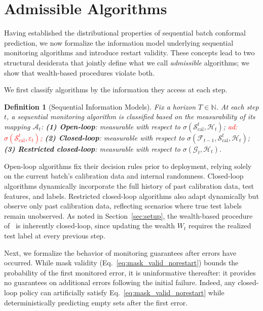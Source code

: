 \documentclass{uai2026} %
\newtheorem{definition}[theorem]{Definition}
\newcommand{\N}{\mathbb{N}}
\newcommand{\1}{\mathbf{1}}
\newcommand{\scal}{\mathcal{S}}
\renewcommand{\epsilon}{\varepsilon}
\newcommand{\F}{\mathcal{F}}
\newcommand{\G}{\mathcal{G}}
\newcommand{\cali}{\mathrm{cal}}
\newcommand{\scalcal}{\scal_{\cali}}
\newcommand{\acal}{\mathcal{A}}
\newcommand{\aymeric}[1]{\textcolor{red}{ad: #1}}
\begin{document}

\section{Admissible Algorithms}
\label{sec:admissible}
\label{sec:beyond}

Having established the distributional properties of sequential batch conformal prediction, we now formalize the information model underlying sequential monitoring algorithms and introduce restart validity. These concepts lead to two structural desiderata that jointly define what we call \emph{admissible} algorithms; we show that wealth-based procedures violate both.

We first classify algorithms by the information they access at each step.

\begin{definition}[Sequential Information Models]
  Fix a horizon $T\in\N$. At each step $t$, a sequential monitoring algorithm is classified based on the measurability of its mapping $\acal_t$:
  \textbf{(1) Open-loop}: measurable with respect to $\sigma(\scalcal^t, \mathcal{H}_t)$; \aymeric{$\sigma(\scalcal^t, \epsilon_t)$;}
  \textbf{(2) Closed-loop}: measurable with respect to $\sigma(\F_{t-1}, \scalcal^t, \mathcal{H}_t)$;
  \textbf{(3) Restricted closed-loop}: measurable with respect to $\sigma(\G_t, \mathcal{H}_t)$.
\end{definition}

Open-loop algorithms fix their decision rules prior to deployment, relying solely on the current batch's calibration data and internal randomness. Closed-loop algorithms dynamically incorporate the full history of past calibration data, test features, and labels. Restricted closed-loop algorithms also adapt dynamically but observe only past calibration data, reflecting scenarios where true test labels remain unobserved. As noted in Section~\ref{sec:setup}, the wealth-based procedure of~\citet{gauthier2025values} is inherently closed-loop, since updating the wealth $W_t$ requires the realized test label at every previous step.

Next, we formalize the behavior of monitoring guarantees after errors have occurred. While mask validity (Eq.~\ref{eq:mask_valid_norestart}) bounds the probability of the first monitored error, it is uninformative thereafter: it provides no guarantees on additional errors following the initial failure. Indeed, any closed-loop policy can artificially satisfy Eq.~\eqref{eq:mask_valid_norestart} while deterministically predicting empty sets after the first error.
\end{document}
